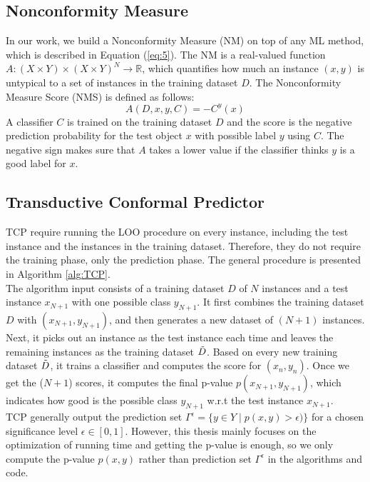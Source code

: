 \documentclass[10pt]{reportMaster}
\begin{document}
\subsection{Nonconformity Measure}
In our work, we build a Nonconformity Measure (NM) on top of any ML method, which is described in Equation (\ref{eq:5}). The NM is a real-valued function $A:(X \times Y) \times (X \times Y)^N \to \mathbb{R}$, which quantifies how much an instance $(x, y)$ is untypical to a set of instances in the training dataset  $D$. The Nonconformity Measure Score (NMS) is defined as follows:
\begin{equation}
    A(D, x, y, C) = -C^{y}(x) \tag{5}\label{eq:5}
\end{equation}
A classifier $C$ is trained on the training dataset $D$ and the score is the negative prediction probability for the test object $x$ with possible label $y$ using $C$. The negative sign makes sure that $A$ takes a lower value if the classifier thinks $y$ is a good label for $x$.

\subsection{Transductive Conformal Predictor}
TCP require running the LOO procedure on every instance, including the test instance and the instances in the training dataset. Therefore, they do not require the training phase, only the prediction phase. The general procedure is presented in Algorithm \ref{alg:TCP}.\\ 

\noindent The algorithm input consists of a training dataset $D$ of $N$ instances and a test instance $x_{N+1}$ with one possible class $y_{N+1}$. It first combines the training dataset $D$ with $(x_{N+1}, y_{N+1})$, and then generates a new dataset of $(N+1)$ instances. Next, it picks out an instance as the test instance each time and leaves the remaining instances as the training dataset $\Tilde{D}$. Based on every new training dataset $\Tilde{D}$, it trains a classifier and computes the score for $(x_n,y_n)$. Once we get the ($N+1$) scores, it computes the final p-value $p(x_{N+1},y_{N+1})$, which indicates how good is the possible class $y_{N+1}$ w.r.t the test instance $x_{N+1}$.\\

\noindent TCP generally output the prediction set $\Gamma^\epsilon =\{y \in Y \;|\; p(x,y) > \epsilon) \}$ for a chosen significance level $\epsilon \in [0,1]$. However, this thesis mainly focuses on the optimization of running time and getting the p-value is enough, so we only compute the p-value $p(x,y)$ rather than prediction set $\Gamma^{\epsilon}$ in the algorithms and code.\\
\end{document}
